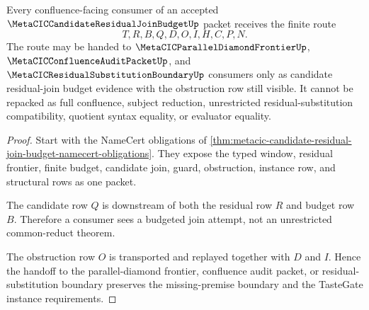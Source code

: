 \begin{theorem}
\label{thm:metacic-candidate-residual-join-budget-nonescape}
Every confluence-facing consumer of an accepted $\MetaCICCandidateResidualJoinBudgetUp$ packet receives the finite route
$$
T,R,B,Q,D,O,I,H,C,P,N .
$$
The route may be handed to $\MetaCICParallelDiamondFrontierUp$, $\MetaCICConfluenceAuditPacketUp$, and $\MetaCICResidualSubstitutionBoundaryUp$ consumers only as candidate residual-join budget evidence with the obstruction row still visible. It cannot be repacked as full confluence, subject reduction, unrestricted residual-substitution compatibility, quotient syntax equality, or evaluator equality.
\end{theorem}
\begin{proof}
Start with the NameCert obligations of \autoref{thm:metacic-candidate-residual-join-budget-namecert-obligations}. They expose the typed window, residual frontier, finite budget, candidate join, guard, obstruction, instance row, and structural rows as one packet.

The candidate row $Q$ is downstream of both the residual row $R$ and budget row $B$. Therefore a consumer sees a budgeted join attempt, not an unrestricted common-reduct theorem.

The obstruction row $O$ is transported and replayed together with $D$ and $I$. Hence the handoff to the parallel-diamond frontier, confluence audit packet, or residual-substitution boundary preserves the missing-premise boundary and the TasteGate instance requirements.
\end{proof}




